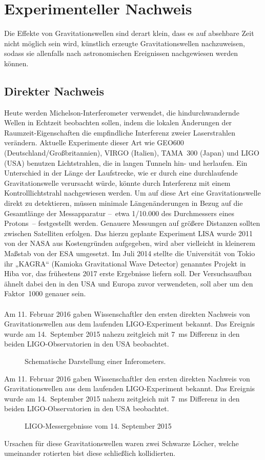 
\chapter{Experimenteller Nachweis}
\label{chapter-fazit}
Die Effekte von Gravitationswellen sind derart klein, dass es auf absehbare Zeit nicht möglich sein wird, künstlich erzeugte Gravitationswellen nachzuweisen, sodass sie allenfalls nach astronomischen Ereignissen nachgewiesen werden können.
\section{Direkter Nachweis}
Heute werden Michelson-Interferometer verwendet, die hindurchwandernde Wellen in Echtzeit beobachten sollen, indem die lokalen Änderungen der Raumzeit-Eigenschaften die empfindliche Interferenz zweier Laserstrahlen verändern. Aktuelle Experimente dieser Art wie GEO600 (Deutschland/Großbritannien), VIRGO (Italien), TAMA 300 (Japan) und LIGO (USA) benutzen Lichtstrahlen, die in langen Tunneln hin- und herlaufen. Ein Unterschied in der Länge der Laufstrecke, wie er durch eine durchlaufende Gravitationswelle verursacht würde, könnte durch Interferenz mit einem Kontrolllichtstrahl nachgewiesen werden. Um auf diese Art eine Gravitationswelle direkt zu detektieren, müssen minimale Längenänderungen in Bezug auf die Gesamtlänge der Messapparatur – etwa 1/10.000 des Durchmessers eines Protons – festgestellt werden. Genauere Messungen auf größere Distanzen sollten zwischen Satelliten erfolgen. Das hierzu geplante Experiment LISA wurde 2011 von der NASA aus Kostengründen aufgegeben, wird aber vielleicht in kleinerem Maßstab von der ESA umgesetzt. Im Juli 2014 stellte die Universität von Tokio ihr „KAGRA“ (Kamioka Gravitational Wave Detector) genanntes Projekt in Hiba vor, das frühestens 2017 erste Ergebnisse liefern soll. Der Versuchsaufbau ähnelt dabei den in den USA und Europa zuvor verwendeten, soll aber um den Faktor 1000 genauer sein. \\\\
Am 11. Februar 2016 gaben Wissenschaftler den ersten direkten Nachweis von Gravitationswellen aus dem laufenden LIGO-Experiment bekannt. Das Ereignis wurde am 14. September 2015 nahezu zeitgleich mit 7 ms Differenz in den beiden LIGO-Observatorien in den USA beobachtet.
\begin{figure}
	\centering
	\caption[Interferometer]{Schematische Darstellung einer Inferometers.}
	\label{fig-flower}
\end{figure}
\newpage
Am 11. Februar 2016 gaben Wissenschaftler den ersten direkten Nachweis von Gravitationswellen aus dem laufenden LIGO-Experiment bekannt. Das Ereignis wurde am 14. September 2015 nahezu zeitgleich mit 7 ms Differenz in den beiden LIGO-Observatorien in den USA beobachtet.
\begin{figure}
	\centering{}
	\caption[LIGO-Messung]{LIGO-Messergebnisse vom 14. September 2015}
\end{figure}

Ursachen für diese Gravitationswellen waren zwei Schwarze Löcher, welche umeinander rotierten bist diese schließlich kollidierten.

